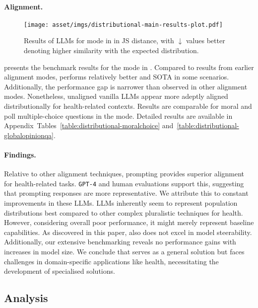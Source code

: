 \paragraph{\distributional Alignment.}
\begin{figure*}[!htp]
    \centering
    \texttt{[image: asset/imgs/distributional-main-results-plot.pdf]}
    \vspace{-0.3cm}
    \caption{Results of LLMs for \distributional mode in \ourdataset in JS distance, with $\downarrow$ values better denoting higher similarity with the expected distribution.}
    \label{fig:distributional-main}
    \vspace{-0.3cm}
\end{figure*}
 presents the benchmark results for the \distributional mode in \ourdataset. Compared to results from earlier alignment modes, \modplural performs relatively better and SOTA in some scenarios. Additionally, the performance gap is narrower than observed in other alignment modes. Nonetheless, unaligned vanilla LLMs appear more adeptly aligned distributionally for health-related contexts. Results are comparable for moral and poll multiple-choice questions in the \distributional mode. Detailed results are available in Appendix~Tables~\ref{table:distributional-moralchoice} and~\ref{table:distributional-globalopinionqa}.

\paragraph{Findings.}
Relative to other alignment techniques, prompting provides superior alignment for health-related tasks. \texttt{GPT-4} and human evaluations support this, suggesting that prompting responses are more representative. We attribute this to constant improvements in these LLMs.  LLMs inherently seem to represent population distributions best compared to other complex pluralistic techniques for health. However, considering overall poor performance, it might merely represent baseline capabilities. As discovered in this paper, \modplural also does not excel in model steerability. Additionally, our extensive benchmarking reveals no performance gains with increases in model size. We conclude that \modplural serves as a general solution but faces challenges in domain-specific applications like health, necessitating the development of specialised solutions.

\subsection{Analysis}
\label{sec:analysis}
